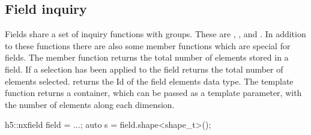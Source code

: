 \subsection{Field inquiry}\label{section:field:inquiry}

Fields share a set of inquiry functions with groups. These are , 
, and . In addition to these functions
there are also some member functions which are special for fields. 
The  member function returns the total number of elements 
stored in a field. If a selection has been applied to the field 
returns the total number of elements selected. 
 returns the Id of the field elements data type. 
The  template function returns a container, which can be passed as
a template parameter, with the number of elements along each dimension. 
\begin{cppcode}
h5::nxfield field = ...;
auto s = field.shape<shape_t>();
\end{cppcode}
